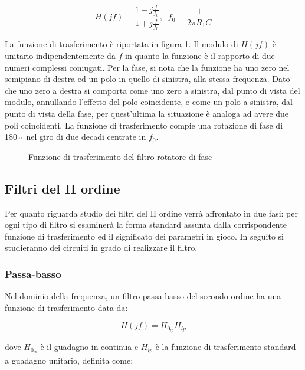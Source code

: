 \documentclass[../main.tex]{subfiles}
\begin{document}
\begin{equation}
		H(jf) = \frac{1 - j\frac{f}{f_0}}{1 + j\frac{f}{f_0}}, \; \; f_0 = \frac{1}{2\pi R_1 C}
\end{equation}


La funzione di trasferimento è riportata in figura \ref{filtri13}. Il modulo di $H(jf)$ è unitario indipendentemente da $f$ in quanto la funzione è il rapporto di due numeri complessi coniugati. Per la fase, si nota che la funzione ha uno zero nel semipiano di destra ed un polo in quello di sinistra, alla stessa frequenza. Dato che uno zero a destra si comporta come uno zero a sinistra, dal punto di vista del modulo, annullando l’effetto del polo coincidente, e come un polo a sinistra, dal punto di vista della fase, per quest’ultima la situazione è analoga ad avere due poli coincidenti. La funzione di trasferimento compie una rotazione di fase di 180◦ nel giro di due decadi centrate in $f_0$.

\begin{figure}
\begin{center}


\label{filtri13}
\caption{Funzione di trasferimento del filtro rotatore di fase}	
\end{center}	
\end{figure}




\subsection{Filtri del II ordine}

Per quanto riguarda  studio dei filtri del II ordine verrà affrontato in due fasi: per ogni tipo di filtro si esaminerà la forma standard assunta dalla corrispondente funzione di trasferimento ed il significato dei parametri in gioco. In seguito si studieranno dei circuiti in grado di realizzare il filtro.

\subsubsection{Passa-basso}

Nel dominio della frequenza, un filtro passa basso del secondo ordine ha una funzione di trasferimento data da:

\begin{equation}
	H(jf) = H_{0_{lp}} H_{lp}
\end{equation}

dove $H_{0_{lp}}$ è il guadagno in continua e $H_{lp}$ è la funzione di trasferimento standard a guadagno unitario, definita come:
\end{document}

